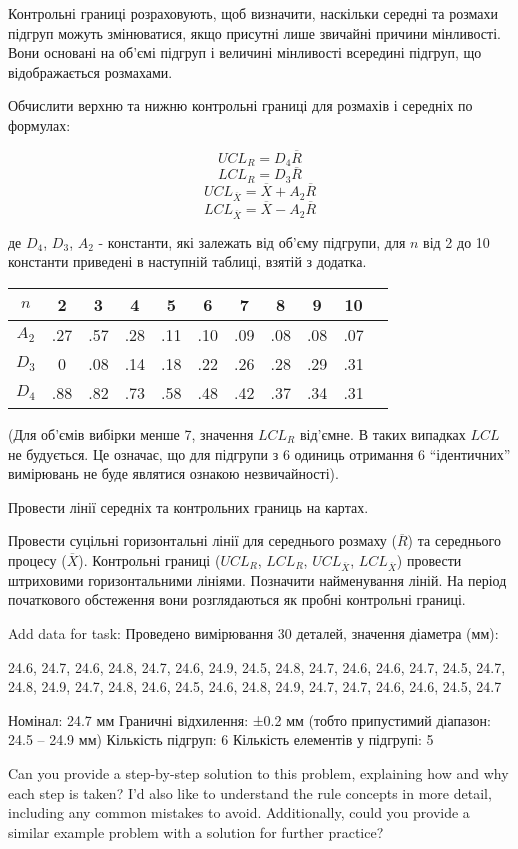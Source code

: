 Контрольні границі розраховують, щоб визначити, наскільки середні та розмахи підгруп можуть змінюватися, якщо присутні лише звичайні причини мінливості. Вони основані на об'ємі підгруп і величині мінливості всередині підгруп, що відображається розмахами.

Обчислити верхню та нижню контрольні границі для розмахів і середніх по формулах:

\[
UCL_R = D_4 \overline{R}
\]
\[
LCL_R = D_3 \overline{R}
\]
\[
UCL_{\overline{X}} = \overline{X} + A_2 \overline{R}
\]
\[
LCL_{\overline{X}} = \overline{X} - A_2 \overline{R}
\]

де $D_4$, $D_3$, $A_2$ - константи, які залежать від об'єму підгрупи, для $n$ від 2 до 10 константи приведені в наступній таблиці, взятій з додатка.

\begin{center}
\begin{tabular}{|c|c|c|c|c|c|c|c|c|c|c|}
\hline
$n$ & 2 & 3 & 4 & 5 & 6 & 7 & 8 & 9 & 10 \\
\hline
$A_2$ & .27 & .57 & .28 & .11 & .10 & .09 & .08 & .08 & .07 \\
\hline
$D_3$ & 0 & .08 & .14 & .18 & .22 & .26 & .28 & .29 & .31 \\
\hline
$D_4$ & .88 & .82 & .73 & .58 & .48 & .42 & .37 & .34 & .31 \\
\hline
\end{tabular}
\end{center}

(Для об'ємів вибірки менше 7, значення $LCL_R$ від'ємне. В таких випадках $LCL$ не будується. Це означає, що для підгрупи з 6 одиниць отримання 6 ``ідентичних'' вимірювань не буде являтися ознакою незвичайності).

Провести лінії середніх та контрольних границь на картах.

Провести суцільні горизонтальні лінії для середнього розмаху ($\overline{R}$) та середнього процесу ($\overline{X}$). Контрольні границі ($UCL_R$, $LCL_R$, $UCL_{\overline{X}}$, $LCL_{\overline{X}}$) провести штриховими горизонтальними лініями. Позначити найменування ліній. На період початкового обстеження вони розглядаються як пробні контрольні границі.


Add data for task:
Проведено вимірювання 30 деталей, значення діаметра (мм):

24.6, 24.7, 24.6, 24.8, 24.7, 24.6, 24.9, 24.5, 24.8, 24.7, 24.6, 24.6, 24.7, 24.5, 24.7, 24.8, 24.9, 24.7, 24.8, 24.6, 24.5, 24.6, 24.8, 24.9, 24.7, 24.7, 24.6, 24.6, 24.5, 24.7

Номінал: 24.7 мм
Граничні відхилення: ±0.2 мм (тобто припустимий діапазон: 24.5 – 24.9 мм)
Кількість підгруп: 6
Кількість елементів у підгрупі: 5

Can you provide a step-by-step solution to this problem, explaining how and why each step is taken? I'd also like to understand the rule concepts in more detail, including any common mistakes to avoid. Additionally, could you provide a similar example problem with a solution for further practice?
